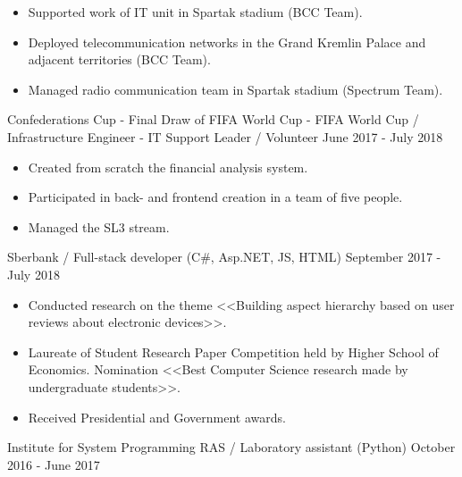 \begin{cventries}
\vspace{-0.4cm}
\cventry
{
\vspace{-0.4cm}
\begin{itemize}
\item Supported work of IT unit in Spartak stadium (BCC Team).
\item Deployed telecommunication networks in the Grand Kremlin Palace and adjacent territories (BCC Team).
\item Managed radio communication team in Spartak stadium (Spectrum Team).
\end{itemize}
} %
{Confederations Cup - Final Draw of FIFA World Cup - FIFA World Cup / Infrastructure Engineer  - IT Support Leader /  Volunteer} %
{} %
{June 2017 - July 2018} %
\noindent	

\vspace{-0.4cm}
\cventry
{
\vspace{-0.4cm}
\begin{itemize}
\item Created from scratch the financial analysis system.
\item Participated in back- and frontend creation in a team of five people.
\item  Managed the SL3 stream.
\end{itemize}
} %
{Sberbank / Full-stack developer (C\#, Asp.NET, JS, HTML)} %
{} %
{September 2017 - July 2018} %
\noindent	


\vspace{-0.4cm}
\cventry
{
\vspace{-0.4cm}
\begin{itemize}
\item Conducted research on the theme <<Building aspect hierarchy based on user reviews about electronic devices>>.
\item Laureate of Student Research Paper Competition held by Higher School of Economics. Nomination <<Best Computer Science research made by undergraduate students>>.
\item Received Presidential and Government awards.
\end{itemize}
} %
{Institute for System Programming RAS / Laboratory assistant (Python)} %
{} %
{October 2016 - June 2017} %
\noindent	



\end{cventries}